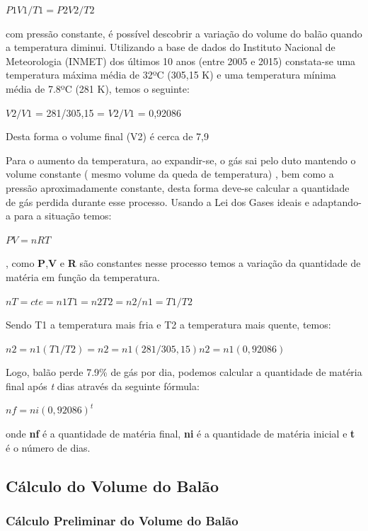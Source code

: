 			$P1V1/T1 = P2V2/T2$

		com pressão constante, é possível descobrir a variação do volume do balão quando a temperatura diminui. Utilizando a base de dados do Instituto Nacional de Meteorologia (INMET) dos últimos 10 anos (entre 2005 e 2015) constata-se uma temperatura máxima média de 32ºC (305,15 K) e uma temperatura mínima média de 7.8ºC (281 K), temos o seguinte:

			 $V2/V1$ = 281/305,15  = $V2/V1$ = 0,92086

		Desta forma o volume final (V2) é cerca de 7,9%
		
		Para o aumento da temperatura, ao expandir-se, o gás sai pelo duto mantendo o volume constante ( mesmo volume da queda de temperatura) , bem como a pressão aproximadamente constante, desta forma deve-se calcular a quantidade de gás perdida durante esse processo. Usando a Lei dos Gases ideais e adaptando-a para a situação temos:

			$PV = nRT$

		, como \textbf{P},\textbf{V} e \textbf{R} são constantes nesse processo temos a variação da quantidade de matéria em função da temperatura.

		$nT = cte  = n1T1 = n2T2  = n2/n1 = T1/T2$

		Sendo T1 a temperatura mais fria e T2 a temperatura mais quente, temos:

			$n2 = n1(T1/T2) = n2 = n1 (281/305,15) n2 = n1 (0,92086)$

		Logo, balão perde 7.9\% de gás por dia, podemos calcular a quantidade de matéria final após \textit{t} dias através da seguinte fórmula:

			$nf = ni (0,92086)^t$
			                                 
 		onde \textbf{nf} é a quantidade de matéria final, \textbf{ni} é a quantidade de matéria inicial e \textbf{t} é o número de dias.


\subsection{Cálculo  do Volume do Balão} %
\label{sub:c_lculo_do_volume_do_bal_o}

	\subsubsection{Cálculo Preliminar do Volume do Balão}

